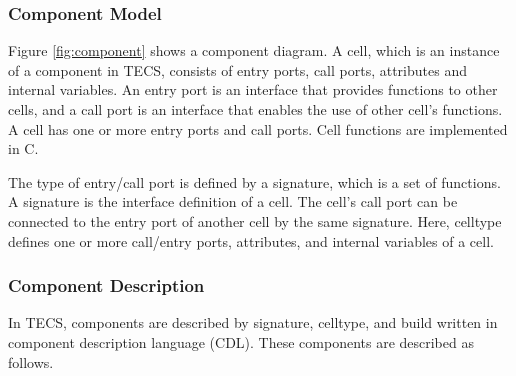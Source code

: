 \documentclass{sig-alternate-05-2015}
\begin{document}
\subsubsection{Component Model}
Figure \ref{fig:component} shows a component diagram.
A {\myit cell}, which is an instance of a component in TECS, consists of {\myit entry} ports, {\myit call} ports, attributes and internal variables.
An {\myit entry} port is an interface that provides functions to other {\myit cell}s, and a {\myit call} port is an interface that enables the use of other {\myit cell}'s functions.
A {\myit cell} has one or more {\myit entry} ports and {\myit call} ports.
{\myit Cell} functions are implemented in C.

The type of {\myit entry}/{\myit call} port is defined by a {\myit signature}, which is a set of functions.
A {\myit signature} is the interface definition of a {\myit cell}.
The {\myit cell}'s  {\myit call} port can be connected to the {\myit entry} port of another {\myit cell} by the same {\myit signature}.
Here, {\myit celltype} defines one or more {\myit call}/{\myit entry} ports, attributes, and internal variables of a {\myit cell}.


\subsubsection{Component Description}
In TECS, components are described by {\myit signature}, {\myit celltype}, and build written in component description language (CDL).
These components are described as follows.
\end{document}
